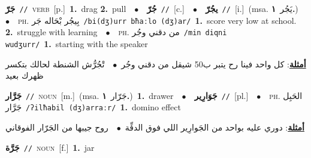 \documentclass[10pt,a4paper,twoside]{article} %
\begin{document}
\begin{multicols}{2}
{\setlength\topsep{0pt}\textbf{\foreignlanguage{arabic}{جَرّ}}\ {\color{gray}\texttt{//}\color{black}}\ \textsc{verb}\ [p.]\ \textbf{1.}~drag  \textbf{2.}~pull\ \ $\bullet$\ \ \setlength\topsep{0pt}\textbf{\foreignlanguage{arabic}{جُرّ}}\ {\color{gray}\texttt{//}\color{black}}\ [c.]\ \ $\bullet$\ \ \setlength\topsep{0pt}\textbf{\foreignlanguage{arabic}{يجُرّ}}\ {\color{gray}\texttt{//}\color{black}}\ [i.]\ \color{gray}(msa. \foreignlanguage{arabic}{يَجُر}~\foreignlanguage{arabic}{\textbf{١.}})\color{black}\ \ $\bullet$\ \ \textsc{ph.} \color{gray} \foreignlanguage{arabic}{بِيجُر بْحَاله جَر}\color{black}\ {\color{gray}\texttt{/{\sffamily bi(dʒ)urr bħaːlo (dʒ)ar}/}\color{black}}\ \textbf{1.}~score very low at school.  \textbf{2.}~struggle with learning\ \ $\bullet$\ \ \textsc{ph.} \color{gray} \foreignlanguage{arabic}{من دقني وجُر}\color{black}\ {\color{gray}\texttt{/{\sffamily min diqni wudʒurr}/}\color{black}}\ \textbf{1.}~starting with the speaker\  \begin{flushright}\color{gray}\foreignlanguage{arabic}{\textbf{\underline{\foreignlanguage{arabic}{أمثلة}}}: كل واحد فينا رح يتبر ب50 شيقل من دقني وجُر\ $\bullet$\ \  تْجُرُّش الشنطة لحالك بتكسر ظهرك بعيد}\end{flushright}\color{black}} \vspace{2mm}

{\setlength\topsep{0pt}\textbf{\foreignlanguage{arabic}{جَرَّار}}\ {\color{gray}\texttt{//}\color{black}}\ \textsc{noun}\ [m.]\ \color{gray}(msa. \foreignlanguage{arabic}{جَرّار}~\foreignlanguage{arabic}{\textbf{١.}})\color{black}\ \textbf{1.}~drawer\ \ $\bullet$\ \ \setlength\topsep{0pt}\textbf{\foreignlanguage{arabic}{جَوَارِير}}\ {\color{gray}\texttt{//}\color{black}}\ [pl.]\ \ $\bullet$\ \ \textsc{ph.} \color{gray} \foreignlanguage{arabic}{الحَبِل جَرَّار}\color{black}\ {\color{gray}\texttt{/{\sffamily ʔilħabil (dʒ)arraːr}/}\color{black}}\ \textbf{1.}~domino effect\  \begin{flushright}\color{gray}\foreignlanguage{arabic}{\textbf{\underline{\foreignlanguage{arabic}{أمثلة}}}: دوري عليه بواحد من الجَوارِير اللي فوق الدفِّة\ $\bullet$\ \  روح جيبها من الجَرّار الفوقاني}\end{flushright}\color{black}} \vspace{2mm}

{\setlength\topsep{0pt}\textbf{\foreignlanguage{arabic}{جَرَّة}}\ {\color{gray}\texttt{//}\color{black}}\ \textsc{noun}\ [f.]\ \textbf{1.}~jar\ } \vspace{2mm}


\end{multicols}
\end{document}
